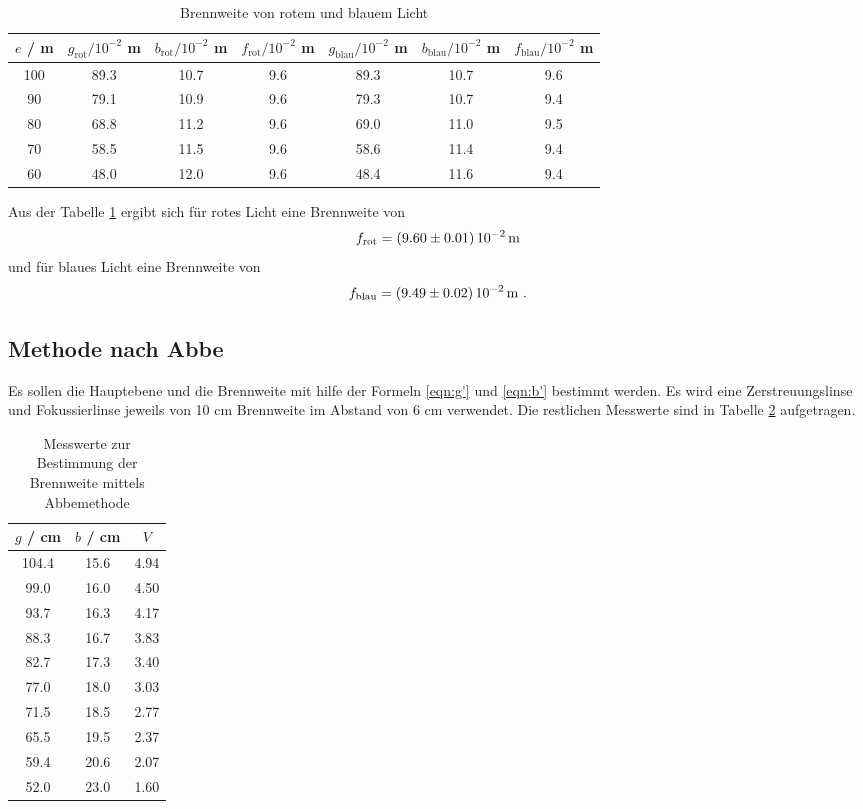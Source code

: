 \begin{table}
  \centering
  \begin{tabular}{c | c c c || c c c}
    \toprule
    $e$ / m & $g_\text{rot} / 10^{-2}$ m & $b_\text{rot} / 10^{-2}$ m & $f_\text{rot} / 10^{-2}$ m & $g_\text{blau} / 10^{-2}$ m & $b_\text{blau} / 10^{-2}$ m & $f_\text{blau} / 10^{-2}$ m \\
    \midrule
    100	& 89.3	& 10.7	& 9.6 &	89.3 & 10.7 & 9.6	\\
    90	& 79.1	& 10.9	& 9.6 & 79.3 & 10.7 & 9.4	\\
    80	& 68.8	& 11.2	& 9.6 & 69.0 & 11.0 & 9.5	\\
    70	& 58.5	& 11.5	& 9.6 & 58.6 & 11.4 & 9.4	\\
    60	& 48.0	& 12.0	& 9.6 & 48.4 & 11.6 & 9.4	\\
    \bottomrule
  \end{tabular}
  \caption{Brennweite von rotem und blauem Licht}
  \label{tab:fbesslf}
\end{table}
Aus der Tabelle \ref{tab:fbesslf} ergibt sich für rotes Licht eine Brennweite von
\begin{equation}
  f_\text{rot} = (\num{9.60 +- 0.01}) \, 10^{-2} \, \text{m}
  \label{eqn:frot}
\end{equation} 
und für blaues Licht eine Brennweite von 
\begin{equation}
  f_\text{blau} = (\num{9.49 +- 0.02}) \, 10^{-2} \, \text{m} \ .
  \label{fblau}
\end{equation}

\subsection{Methode nach Abbe}
Es sollen die Hauptebene und die Brennweite mit hilfe der Formeln \ref{eqn:g'} und \ref{eqn:b'} bestimmt werden. Es wird eine Zerstreuungslinse und Fokussierlinse jeweils von 10 cm Brennweite im Abstand von 6 cm verwendet. Die restlichen Messwerte sind in Tabelle \ref{tab:mabbe} aufgetragen. 
\begin{table}
  \centering
  \begin{tabular}{c c c}
    \toprule
    	$g$ / cm & $b$ / cm & $V$ \\
    \midrule	
	104.4	& 15.6	& 4.94	\\
	99.0	& 16.0	& 4.50	\\
	93.7	& 16.3	& 4.17	\\
	88.3	& 16.7	& 3.83	\\
	82.7	& 17.3	& 3.40	\\
	77.0	& 18.0	& 3.03	\\
	71.5	& 18.5	& 2.77	\\
	65.5	& 19.5	& 2.37	\\
	59.4	& 20.6	& 2.07	\\
	52.0	& 23.0	& 1.60	\\
    \bottomrule
  \end{tabular}
  \caption{Messwerte zur Bestimmung der Brennweite mittels Abbemethode}
  \label{tab:mabbe}
\end{table}

